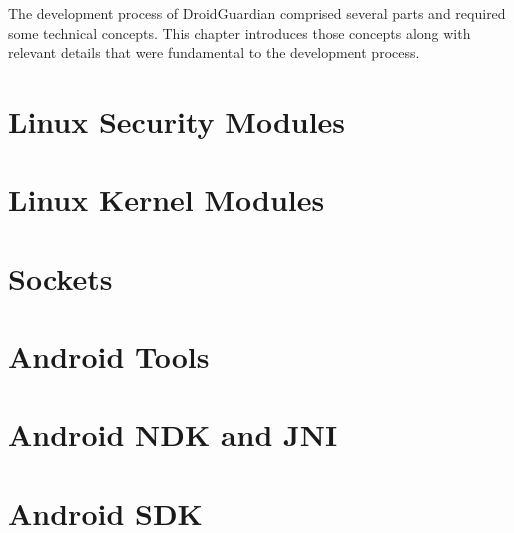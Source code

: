 The development process of DroidGuardian comprised several parts and required some technical concepts. This chapter introduces those concepts along with relevant details that were fundamental to the development process.

\section{Linux Security Modules}


\section{Linux Kernel Modules}

\section{Sockets}



\section{Android Tools}




\section{Android NDK and JNI}



\section{Android SDK}
